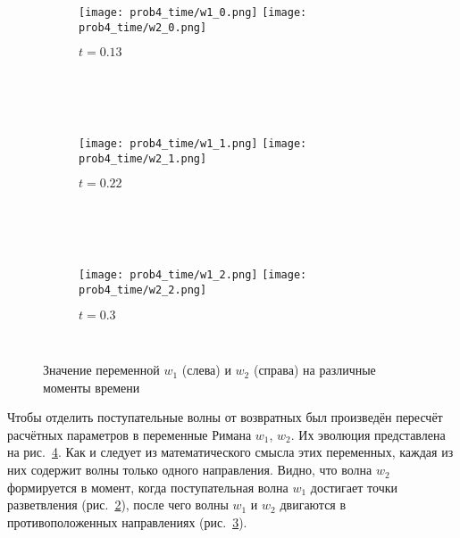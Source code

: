 \begin{figure}[h!]
\begin{subfigure}{1.0\linewidth}\centering
\texttt{[image: prob4\_time/w1\_0.png]}
\texttt{[image: prob4\_time/w2\_0.png]}
\caption{$t = 0.13$}\label{fig:prob4_w12_a}
\end{subfigure} \\
\hfill \\
\hfill \\
\begin{subfigure}{1.0\linewidth}\centering
\texttt{[image: prob4\_time/w1\_1.png]}
\texttt{[image: prob4\_time/w2\_1.png]}
\caption{$t = 0.22$}\label{fig:prob4_w12_b}
\end{subfigure}\\
\hfill \\
\hfill \\
\begin{subfigure}{1.0\linewidth}\centering
\texttt{[image: prob4\_time/w1\_2.png]}
\texttt{[image: prob4\_time/w2\_2.png]}
\caption{$t=0.3$}\label{fig:prob4_w12_c}
\end{subfigure}\\
\caption{Значение переменной $w_1$ (слева) и $w_2$ (справа) на различные моменты времени}\label{fig:prob4_w12}
\end{figure}

Чтобы отделить поступательные волны от возвратных
был произведён пересчёт расчётных параметров
в переменные Римана $w_1$, $w_2$.
Их эволюция представлена на рис.~\ref{fig:prob4_w12}.
Как и следует из математического смысла этих переменных, каждая
из них содержит волны только одного направления.
Видно, что волна $w_2$ формируется
в момент, когда поступательная волна $w_1$
достигает точки разветвления (рис.~\ref{fig:prob4_w12_b}),
после чего волны $w_1$  и $w_2$ двигаются в противоположенных направлениях (рис.~\ref{fig:prob4_w12_c}).


